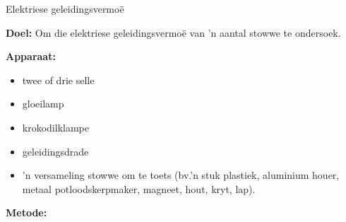 \label{m38706*secfhsst!!!underscore!!!id357}
            \begin{g_experiment}{Elektriese geleidingsvermo\"e}{
            \nopagebreak
            \label{m38706*id66151}\noindent{}\textbf{Doel:}
        \newline
     Om die elektriese geleidingsvermoë van 'n aantal stowwe te ondersoek.\par 
      \label{m38706*id66166}\noindent{}\textbf{Apparaat:} \\
\begin{minipage}{.5\textwidth}
      \label{m38706*id66175}\begin{itemize}[noitemsep]
            \label{m38706*uid95}\item twee of drie selle
\label{m38706*uid96}\item gloeilamp
\label{m38706*uid97}\item krokodilklampe
\label{m38706*uid98}\item geleidingsdrade
\label{m38706*uid99}\item 'n versameling stowwe om te toets (bv.'n stuk plastiek, aluminium houer, metaal potloodskerpmaker, magneet, hout, kryt, lap).
\end{itemize}
\end{minipage}
\begin{minipage}{.5\textwidth}
      \label{m38706*id66241}
    \setcounter{subfigure}{0}
	\begin{figure}[H] %
    \begin{center}
    \end{center}
 \end{figure}  
\end{minipage}     
      \par 
      \label{m38706*id66251}\noindent{}\textbf{Metode:}
}
\end{g_experiment}
